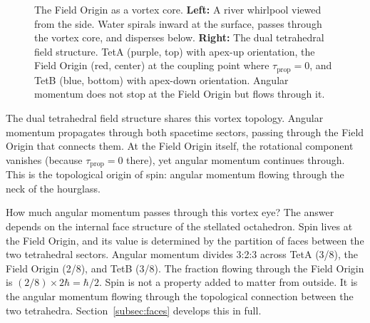 \documentclass[aps,prd,preprint,superscriptaddress,showpacs,preprintnumbers,amsmath,amssymb,nofootinbib]{revtex4-2}
\begin{document}
\begin{figure}[H]
\caption{The Field Origin as a vortex core.
\textbf{Left:} A river whirlpool viewed from the side. Water spirals inward at the surface, passes through the vortex core, and disperses below.
\textbf{Right:} The dual tetrahedral field structure. TetA (purple, top) with apex-up orientation, the Field Origin (red, center) at the coupling point where $\tau_{\text{prop}} = 0$, and TetB (blue, bottom) with apex-down orientation. Angular momentum does not stop at the Field Origin but flows through it.}
\label{fig:vortex}
\end{figure}

The dual tetrahedral field structure shares this vortex topology. Angular momentum propagates through both spacetime sectors, passing through the Field Origin that connects them. At the Field Origin itself, the rotational component vanishes (because $\tau_{\text{prop}} = 0$ there), yet angular momentum continues through. This is the topological origin of spin: angular momentum flowing through the neck of the hourglass.

How much angular momentum passes through this vortex eye? The answer depends on the internal face structure of the stellated octahedron. Spin lives at the Field Origin, and its value is determined by the partition of faces between the two tetrahedral sectors. Angular momentum divides 3:2:3 across TetA (3/8), the Field Origin (2/8), and TetB (3/8). The fraction flowing through the Field Origin is $(2/8) \times 2\hbar = \hbar/2$. Spin is not a property added to matter from outside. It is the angular momentum flowing through the topological connection between the two tetrahedra. Section~\ref{subsec:faces} develops this in full.
\end{document}
